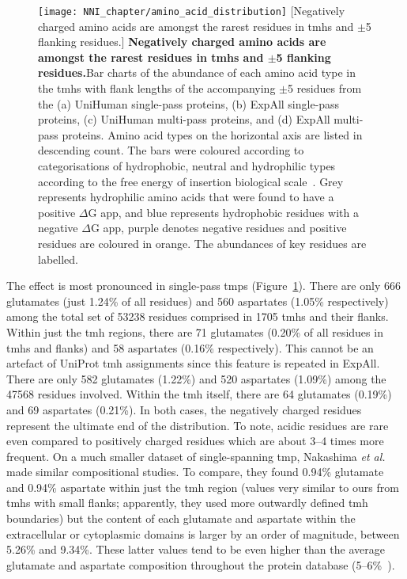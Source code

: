 \begin{figure}[!ht]
\centering
\texttt{[image: NNI\_chapter/amino\_acid\_distribution]}
[Negatively charged amino acids are amongst the rarest residues in \gls{tmh}s and $\pm$5 flanking residues.] {\textbf{Negatively charged amino acids are amongst the rarest residues in \gls{tmh}s and $\pm$5 flanking residues.}Bar charts of the abundance of each amino acid type in the \gls{tmh}s with flank lengths of the accompanying $\pm$5 residues from the (a) UniHuman single-pass proteins, (b) ExpAll single-pass proteins, (c) UniHuman multi-pass proteins, and (d) ExpAll multi-pass proteins.
Amino acid types on the horizontal axis are listed in descending count.
The bars were coloured according to categorisations of hydrophobic, neutral and hydrophilic types according to the free energy of insertion biological scale~\cite{Hessa2005}.
Grey represents hydrophilic amino acids that were found to have a positive $\Delta$G app, and blue represents hydrophobic residues with a negative $\Delta$G app, purple denotes negative residues and positive residues are coloured in orange.
The abundances of key residues are labelled.}

\label{fig:amino_acid_distribution}
\end{figure}

The effect is most pronounced in single-pass \gls{tmp}s (Figure~\ref{fig:amino_acid_distribution}).
There are only 666 glutamates (just 1.24\% of all residues) and 560 aspartates (1.05\% respectively) among the total set of 53238 residues comprised in 1705 \gls{tmh}s and their flanks.
Within just the \gls{tmh} regions, there are 71 glutamates (0.20\% of all residues in \gls{tmh}s and flanks) and 58 aspartates (0.16\% respectively).
This cannot be an artefact of UniProt \gls{tmh} assignments since this feature is repeated in ExpAll.
There are only 582 glutamates (1.22\%) and 520 aspartates (1.09\%) among the 47568 residues involved.
Within the \gls{tmh} itself, there are 64 glutamates (0.19\%) and 69 aspartates (0.21\%).
In both cases, the negatively charged residues represent the ultimate end of the distribution.
To note, acidic residues are rare even compared to positively charged residues which are about 3--4 times more frequent.
On a much smaller dataset of single-spanning \gls{tmp}, Nakashima \textit{et al.}
~\cite{Nakashima1992} made similar compositional studies.
To compare, they found 0.94\% glutamate and 0.94\% aspartate within just the \gls{tmh} region (values very similar to ours from \gls{tmh}s with small flanks; apparently, they used more outwardly defined \gls{tmh} boundaries) but the content of each glutamate and aspartate within the extracellular or cytoplasmic domains is larger by an order of magnitude, between 5.26\% and 9.34\%.
These latter values tend to be even higher than the average glutamate and aspartate composition throughout the protein database (5--6\%~\cite{Nakashima1992}).

